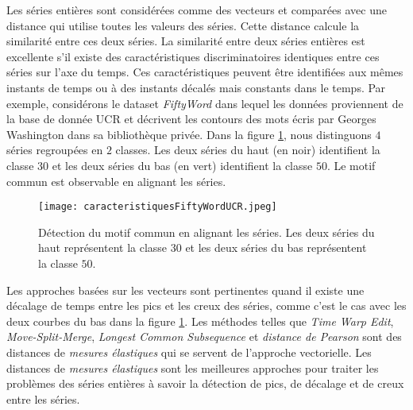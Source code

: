 Les s\'eries enti\`eres sont consid\'er\'ees comme des vecteurs et compar\'ees avec une distance qui utilise toutes les valeurs des s\'eries. 
Cette distance calcule la similarit\'e entre ces deux s\'eries.
La similarit\'e entre deux s\'eries enti\`eres est excellente  s'il existe des caract\'eristiques discriminatoires identiques entre ces s\'eries sur l'axe du temps. Ces caract\'eristiques peuvent \^etre identifi\'ees aux m\^emes instants de temps ou \`a des instants d\'ecal\'es mais constants dans le temps. 
\newline
Par exemple, consid\'erons le dataset {\em FiftyWord} \cite{rath2003word} dans lequel les donn\'ees proviennent de la base de donn\'ee {UCR} \cite{chen2015ucr} et d\'ecrivent les contours des mots \'ecris par Georges Washington dans sa biblioth\`eque priv\'ee. Dans la figure \ref{caracteristiquesFiftyWordUCR}, nous distinguons $4$ s\'eries regroup\'ees en $2$ classes. Les deux s\'eries du haut (en noir) identifient la classe $30$ et les deux s\'eries du bas (en vert) identifient la classe $50$. Le motif commun est observable en alignant les s\'eries.
\begin{figure}[htb!] 
\centering
\texttt{[image: caracteristiquesFiftyWordUCR.jpeg]}
\caption{D\'etection du motif commun en alignant les s\'eries. Les deux s\'eries du haut repr\'esentent la classe $30$ et les deux s\'eries du bas repr\'esentent la classe $50$.}
\label{caracteristiquesFiftyWordUCR}
\end{figure}

Les approches bas\'ees sur les vecteurs sont pertinentes quand il existe une d\'ecalage de temps entre les pics et les creux des s\'eries, comme c'est le cas avec les deux courbes du bas dans la figure \ref{caracteristiquesFiftyWordUCR}. 
\newline
Les m\'ethodes telles que 
{\em Time Warp Edit}, {\em Move-Split-Merge}, 
{\em Longest Common Subsequence } et 
{\em distance de Pearson} sont des distances de {\em mesures \'elastiques} qui se servent de l'approche vectorielle. 
Les  distances de {\em mesures \'elastiques} sont les meilleures approches pour traiter les probl\`emes des s\'eries enti\`eres \`a savoir la d\'etection de pics, de d\'ecalage et de creux entre les s\'eries.

